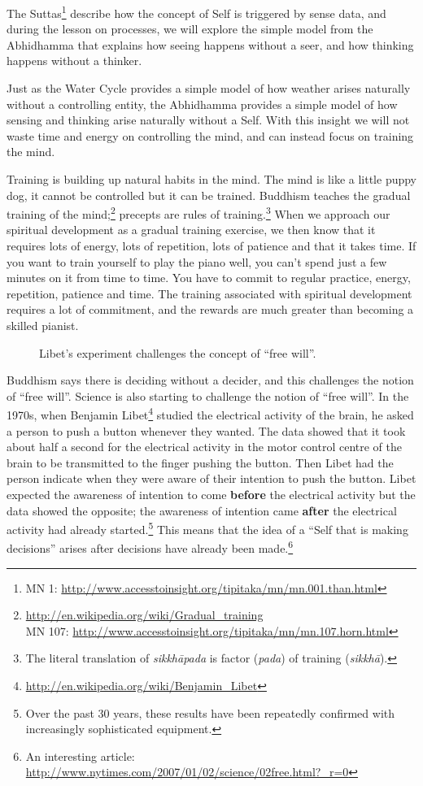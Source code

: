 The Suttas\footnote{MN 1: \url{http://www.accesstoinsight.org/tipitaka/mn/mn.001.than.html}} describe how the concept of Self is triggered by sense data, and during the lesson on processes, we will explore the simple model from the Abhidhamma that explains how seeing happens without a seer, and how thinking happens without a thinker.

Just as the Water Cycle provides a simple model of how weather arises naturally without a controlling entity, the Abhidhamma provides a simple model of how sensing and thinking arise naturally without a Self. With this insight we will not waste time and energy on controlling the mind, and can instead focus on training the mind.

Training is building up natural habits in the mind. The mind is like a little puppy dog, it cannot be controlled but it can be trained. Buddhism teaches the gradual training of the mind;\footnote{\url{http://en.wikipedia.org/wiki/Gradual_training}\\MN 107: \url{http://www.accesstoinsight.org/tipitaka/mn/mn.107.horn.html}} precepts are rules of training.\footnote{The literal translation of \textit{sikkhāpada} is factor (\textit{pada}) of training (\textit{sikkhā}).} When we approach our spiritual development as a gradual training exercise, we then know that it requires lots of energy, lots of repetition, lots of patience and that it takes time. If you want to train yourself to play the piano well, you can’t spend just a few minutes on it from time to time. You have to commit to regular practice, energy, repetition, patience and time. The training associated with spiritual development requires a lot of commitment, and the rewards are much greater than becoming a skilled pianist.

\begin{figure}[H]
\centering

\caption{Libet’s experiment challenges the concept of “free will”.}
\label{fig:Libet}
\end{figure}

Buddhism says there is deciding without a decider, and this challenges the notion of “free will”. Science is also starting to challenge the notion of “free will”. In the 1970s, when Benjamin Libet\footnote{\url{http://en.wikipedia.org/wiki/Benjamin_Libet}} studied the electrical activity of the brain, he asked a person to push a button whenever they wanted. The data showed that it took about half a second for the electrical activity in the motor control centre of the brain to be transmitted to the finger pushing the button. Then Libet had the person indicate when they were aware of their intention to push the button. Libet expected the awareness of intention to come \textbf{before} the electrical activity but the data showed the opposite; the awareness of intention came \textbf{after} the electrical activity had already started.\footnote{Over the past 30 years, these results have been repeatedly confirmed with increasingly sophisticated equipment.} This means that the idea of a “Self that is making decisions” arises after decisions have already been made.\footnote{An interesting article: \url{http://www.nytimes.com/2007/01/02/science/02free.html?_r=0}}

